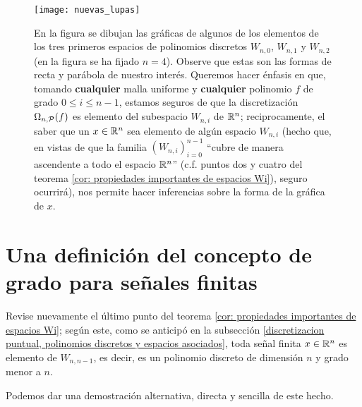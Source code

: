 \begin{figure}[H]
\centering\captionsetup{format = hang}
	\begin{measuredfigure}
		\texttt{[image: nuevas\_lupas]} 
		\caption{
	En la figura	
	se dibujan las gráficas de algunos de los elementos
	de los tres primeros espacios de polinomios discretos
	$W_{n,0}$, $W_{n,1}$ y $W_{n,2}$
	(en la figura se ha fijado $n=4$).
    Observe que estas son
	las formas de recta y parábola de
	nuestro interés. 
	Queremos hacer énfasis en que, tomando
	\textbf{cualquier} malla uniforme y \textbf{cualquier} 
	polinomio $f$
	de grado $0 \leq i \leq n-1$, estamos seguros de que
	la discretización $\Omega_{n, \mathcal{P}}(f)$ es elemento
	del subespacio $W_{n,i}$ de $\mathbb{R}^{n}$; reciprocamente, el 
	saber que un $x \in \mathbb{R}^{n}$ sea elemento 
	de algún espacio $W_{n,i}$ (hecho
	que, en vistas de que la familia $(W_{n,i})_{i=0}^{n-1}$
	``cubre de manera ascendente a todo el espacio $\mathbb{R}^{n}$''
	(c.f. puntos dos y cuatro del teorema 
	\ref{cor: propiedades importantes de espacios Wi}), seguro 
	ocurrirá), nos permite hacer inferencias sobre la forma 
	de la gráfica de $x$.}
 	\end{measuredfigure}
 \end{figure}





\section{Una definición del concepto de grado para señales finitas}
\label{definicion del concepto de grado para seniales finitas}

Revise nuevamente el último punto del teorema
\ref{cor: propiedades importantes de espacios Wi}; según este,
como se anticipó en la subsección 
\ref{discretizacion puntual, polinomios discretos y espacios asociados},
toda señal finita $x \in \mathbb{R}^{n}$
es elemento de $W_{n,n-1}$,
es decir, es un polinomio discreto
de dimensión $n$ y grado menor a $n$.

Podemos dar una demostración
alternativa,
directa y sencilla de este hecho.

